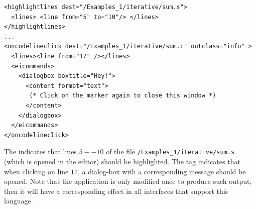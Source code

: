 \medskip
\begin{lstlisting}
<highlightlines dest="/Examples_1/iterative/sum.s"> 
  <lines> <line from="5" to="10"/> </lines>
</highlightlines>
...
<oncodelineclick dest="/Examples_1/iterative/sum.c" outclass="info" >
  <lines><line from="17" /></lines>
  <eicommands>
    <dialogbox boxtitle="Hey!"> 
      <content format="text">
       (* Click on the marker again to close this window *)
      </content>
    </dialogbox>
  </eicommands>
</oncodelineclick>

\end{lstlisting}

\medskip
\noindent
The  indicates that lines $5--10$ of the file
\texttt{/Examples\_1/iterative/sum.s} (which is opened in the editor)
should be highlighted. The  tag indicates that
when clicking on line $17$, a dialog-box with a corresponding message
should be opened.
%
Note that the application is only modified once to produce such
output, then it will have a corresponding effect in all interfaces
that support this language.





